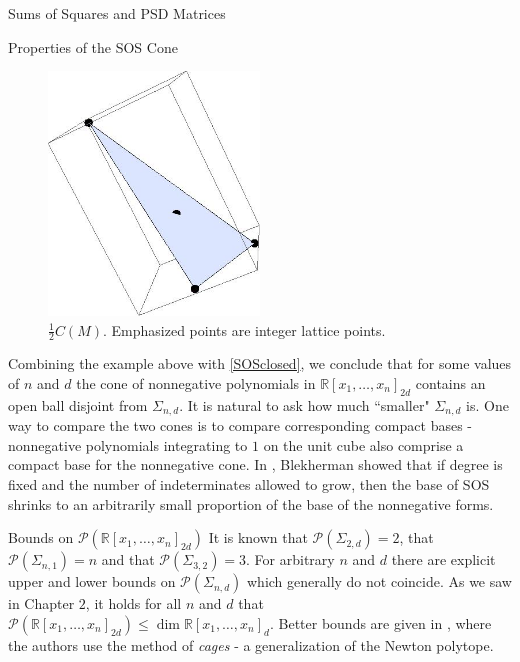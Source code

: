 \documentclass[12pt,oneside,final]{ucthesisucsbmath2010}
\newcommand{\R}{\mathbb{R}}
\newcommand{\p}{\mathcal{P}}
\newcommand{\snd}{\Sigma_{n,d}}
\newcommand{\pnd}{\R[x_1,\ldots,x_n]_{2d}}
\newcommand{\pn}{\R[x_1,\ldots,x_n]}
\theoremstyle{definition}
\begin{document}
\begin{chapter}{Sums of Squares and PSD Matrices}
\begin{section}{Properties of the SOS Cone}
\begin{figure}[H]
  
  \begin{center}
    \includegraphics[width=0.5\textwidth]{Motzkin}
    \caption{$\tfrac{1}{2}C(M)$. Emphasized points are integer lattice points.}
    \label{Motzkin}
  \end{center}
\end{figure}

Combining the example above with \ref{SOSclosed}, we conclude that for some values of $n$ and $d$ the cone of nonnegative polynomials in $\pnd$ contains an open ball disjoint from $\snd$. It is natural to ask how much ``smaller" $\snd$ is. One way to compare the two cones is to compare corresponding compact bases - nonnegative polynomials integrating to $1$ on the unit cube also comprise a compact base for the nonnegative cone. In \cite{blek2}, Blekherman showed that if degree is fixed and the number of indeterminates allowed to grow, then the base of SOS shrinks to an arbitrarily small proportion of the base of the nonnegative forms. 

\label{SOSprops}
\end{section}





\begin{section}{Bounds on $\p(\pnd)$}
It is known that $\p(\Sigma_{2,d})=2$, that $\p(\Sigma_{n,1}) = n$ and that $\p(\Sigma_{3,2})=3$. For arbitrary $n$ and $d$ there are explicit upper and lower bounds on $\p(\snd)$ which generally do not coincide. As we saw in Chapter $2$, it holds for all $n$ and $d$ that $\p(\pnd) \leq \dim \pn_d$. Better bounds are given in \cite{RezChoiLam}, where the authors use the method of \emph{cages} - a generalization of the Newton polytope.


\end{section}
\end{chapter}
\end{document}

